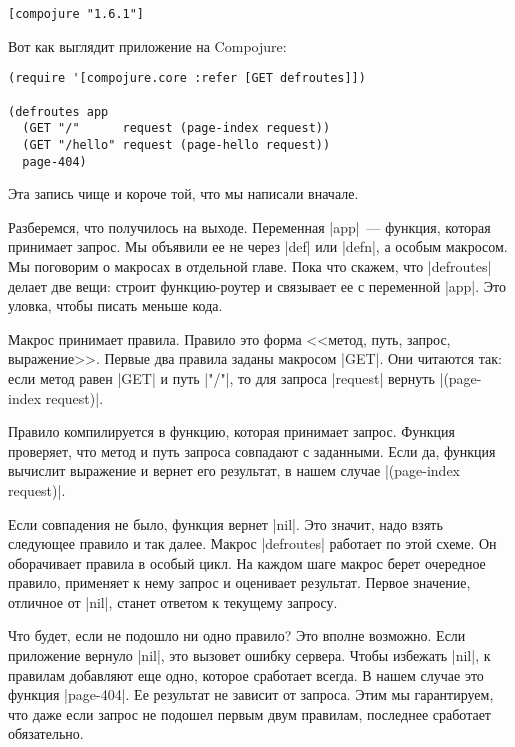 \begin{verbatim}
[compojure "1.6.1"]
\end{verbatim}

\noindent
Вот как выглядит приложение на Compojure:

\begin{verbatim}
(require '[compojure.core :refer [GET defroutes]])

(defroutes app
  (GET "/"      request (page-index request))
  (GET "/hello" request (page-hello request))
  page-404)
\end{verbatim}

\noindent

Эта запись чище и короче той, что мы написали вначале.

Разберемся, что получилось на выходе. Переменная \spverb|app|~--- функция, которая
принимает запрос. Мы объявили ее не через \spverb|def| или \spverb|defn|,
а особым макросом. Мы поговорим о макросах в отдельной главе. Пока что
скажем, что \spverb|defroutes| делает две вещи: строит функцию-роутер и связывает ее с
переменной \spverb|app|. Это уловка, чтобы писать меньше кода.

Макрос принимает правила. Правило это форма <<метод, путь, запрос,
выражение>>. Первые два правила заданы макросом \spverb|GET|. Они читаются так: если
метод равен \spverb|GET| и путь \spverb|"/"|, то для запроса \spverb|request|
вернуть \spverb|(page-index request)|.

Правило компилируется в функцию, которая принимает запрос. Функция проверяет,
что метод и путь запроса совпадают с заданными. Если да, функция вычислит
выражение и вернет его результат, в нашем случае \spverb|(page-index request)|.

Если совпадения не было, функция вернет \spverb|nil|. Это
значит, надо взять следующее правило и так далее. Макрос \spverb|defroutes|
работает по этой схеме. Он оборачивает правила в особый цикл. На каждом
шаге макрос берет очередное правило, применяет к нему запрос и оценивает
результат. Первое значение, отличное от \spverb|nil|, станет ответом к текущему запросу.

Что будет, если не подошло ни одно правило? Это вполне возможно. Если
приложение вернуло \spverb|nil|, это вызовет ошибку сервера. Чтобы избежать \spverb|nil|,
к правилам добавляют еще одно, которое сработает всегда. В нашем случае это функция \spverb|page-404|.
Ее результат не зависит от запроса. Этим мы гарантируем, что даже если запрос не подошел
первым двум правилам, последнее сработает обязательно.

